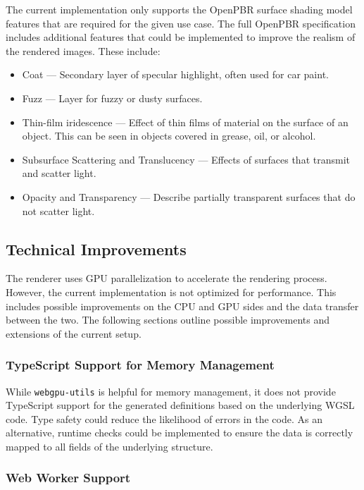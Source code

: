 The current implementation only supports the \gls{OpenPBR} surface shading model features that are required for the given use case. The full \gls{OpenPBR} specification includes additional features that could be implemented to improve the realism of the rendered images. These include:

\begin{itemize}
  \item{Coat} — Secondary layer of specular highlight, often used for car paint.
  \item{Fuzz} — Layer for fuzzy or dusty surfaces.
  \item{Thin-film iridescence} — Effect of thin films of material on the surface of an object. This can be seen in objects covered in grease, oil, or alcohol.
  \item{Subsurface Scattering and Translucency} — Effects of surfaces that transmit and scatter light.
  \item{Opacity and Transparency} — Describe partially transparent surfaces that do not scatter light.
\end{itemize}

\subsection*{Technical Improvements}

The renderer uses \gls{GPU} parallelization to accelerate the rendering process. However, the current implementation is not optimized for performance. This includes possible improvements on the \gls{CPU} and \gls{GPU} sides and the data transfer between the two. The following sections outline possible improvements and extensions of the current setup.

\subsubsection*{TypeScript Support for Memory Management}

While \texttt{webgpu-utils} \cite{webgpuUtilsLib} is helpful for memory management, it does not provide \gls{TypeScript} support for the generated definitions based on the underlying \gls{WGSL} code. Type safety could reduce the likelihood of errors in the code. As an alternative, runtime checks could be implemented to ensure the data is correctly mapped to all fields of the underlying structure.

\subsubsection*{Web Worker Support}

